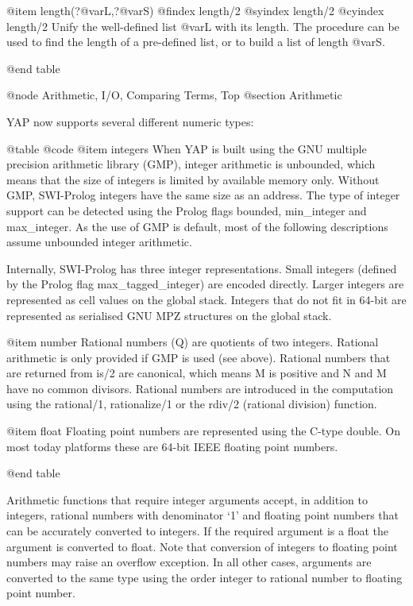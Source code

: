{{{{@item length(?@var{L},?@var{S})
@findex length/2
@syindex length/2
@cyindex length/2
Unify the well-defined list @var{L} with its length. The procedure can
be used to find the length of a pre-defined list, or to build a list
of length @var{S}.

@end table

@node Arithmetic, I/O, Comparing Terms, Top
@section Arithmetic

YAP now supports several different numeric types:

@table @code
@item integers
      When YAP is built using the GNU multiple precision arithmetic
      library (GMP), integer arithmetic is unbounded, which means that
      the size of integers is limited by available memory only. Without
      GMP, SWI-Prolog integers have the same size as an address. The
      type of integer support can be detected using the Prolog flags
      bounded, min_integer and max_integer. As the use of GMP is
      default, most of the following descriptions assume unbounded
      integer arithmetic.

      Internally, SWI-Prolog has three integer representations. Small
      integers (defined by the Prolog flag max_tagged_integer) are
      encoded directly. Larger integers are represented as cell values
      on the global stack. Integers that do not fit in 64-bit are
      represented as serialised GNU MPZ structures on the global stack.

@item number
      Rational numbers (Q) are quotients of two integers. Rational
      arithmetic is only provided if GMP is used (see above). Rational
      numbers that are returned from is/2 are canonical, which means M
      is positive and N and M have no common divisors. Rational numbers
      are introduced in the computation using the rational/1,
      rationalize/1 or the rdiv/2 (rational division) function. 

@item float
      Floating point numbers are represented using the C-type double. On most today platforms these are 64-bit IEEE floating point numbers.

@end table

Arithmetic functions that require integer arguments accept, in addition
to integers, rational numbers with denominator `1' and floating point
numbers that can be accurately converted to integers. If the required
argument is a float the argument is converted to float. Note that
conversion of integers to floating point numbers may raise an overflow
exception. In all other cases, arguments are converted to the same type
using the order integer to rational number to floating point number.


}}}}
